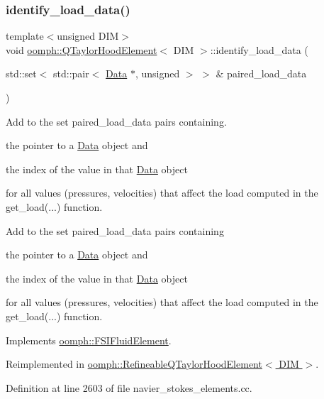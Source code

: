 \subsubsection{\texorpdfstring{identify\+\_\+load\+\_\+data()}{identify\_load\_data()}}
{\footnotesize\ttfamily template$<$unsigned D\+IM$>$ \\
void \hyperlink{classoomph_1_1QTaylorHoodElement}{oomph\+::\+Q\+Taylor\+Hood\+Element}$<$ D\+IM $>$\+::identify\+\_\+load\+\_\+data (\begin{DoxyParamCaption}\item[{std\+::set$<$ std\+::pair$<$ \hyperlink{classoomph_1_1Data}{Data} $\ast$, unsigned $>$ $>$ \&}]{paired\+\_\+load\+\_\+data }\end{DoxyParamCaption})\hspace{0.3cm}{\ttfamily [virtual]}}



Add to the set {\ttfamily paired\+\_\+load\+\_\+data} pairs containing. 


\begin{DoxyItemize}
\item the pointer to a \hyperlink{classoomph_1_1Data}{Data} object and
\item the index of the value in that \hyperlink{classoomph_1_1Data}{Data} object
\end{DoxyItemize}for all values (pressures, velocities) that affect the load computed in the {\ttfamily get\+\_\+load}(...) function.

Add to the set {\ttfamily paired\+\_\+load\+\_\+data} pairs containing
\begin{DoxyItemize}
\item the pointer to a \hyperlink{classoomph_1_1Data}{Data} object and
\item the index of the value in that \hyperlink{classoomph_1_1Data}{Data} object
\end{DoxyItemize}for all values (pressures, velocities) that affect the load computed in the {\ttfamily get\+\_\+load}(...) function. 

Implements \hyperlink{classoomph_1_1FSIFluidElement_a13c5f835cddd1b78e6d2582733619300}{oomph\+::\+F\+S\+I\+Fluid\+Element}.



Reimplemented in \hyperlink{classoomph_1_1RefineableQTaylorHoodElement_af9358dd7b65ca4a1005980d50986db0d}{oomph\+::\+Refineable\+Q\+Taylor\+Hood\+Element$<$ D\+I\+M $>$}.



Definition at line 2603 of file navier\+\_\+stokes\+\_\+elements.\+cc.



